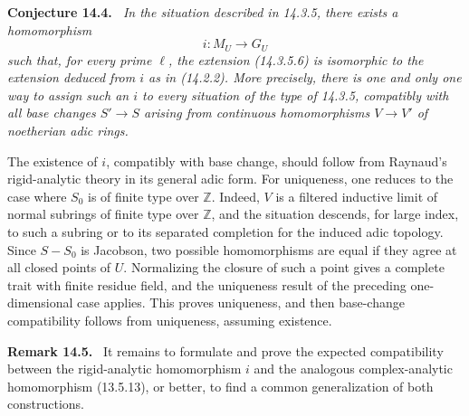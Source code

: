 \documentclass[12pt]{article}
\providecommand{\Z}{\mathbb Z}
\newenvironment{statement}[1]{\par\medskip\noindent\textbf{#1.}\itshape\ }{\par\medskip}
\newenvironment{remarktext}[1]{\par\medskip\noindent\textbf{#1.}\ }{\par\medskip}
\begin{document}
\begin{statement}{Conjecture 14.4}
In the situation described in 14.3.5, there exists a homomorphism
\begin{equation}\tag{14.4.1}
        i:M_U\longrightarrow G_U
\end{equation}
such that, for every prime $\ell$, the extension (14.3.5.6) is isomorphic to the extension deduced from $i$ as in (14.2.2).  More precisely, there is one and only one way to assign such an $i$ to every situation of the type of 14.3.5, compatibly with all base changes $S'\to S$ arising from continuous homomorphisms $V\to V'$ of noetherian adic rings.
\end{statement}

The existence of $i$, compatibly with base change, should follow from Raynaud's rigid-analytic theory in its general adic form.  For uniqueness, one reduces to the case where $S_0$ is of finite type over $\Z$.  Indeed, $V$ is a filtered inductive limit of normal subrings of finite type over $\Z$, and the situation descends, for large index, to such a subring or to its separated completion for the induced adic topology.  Since $S-S_0$ is Jacobson, two possible homomorphisms are equal if they agree at all closed points of $U$.  Normalizing the closure of such a point gives a complete trait with finite residue field, and the uniqueness result of the preceding one-dimensional case applies.  This proves uniqueness, and then base-change compatibility follows from uniqueness, assuming existence.

\begin{remarktext}{Remark 14.5}
It remains to formulate and prove the expected compatibility between the rigid-analytic homomorphism $i$ and the analogous complex-analytic homomorphism (13.5.13), or better, to find a common generalization of both constructions.
\end{remarktext}
\end{document}
